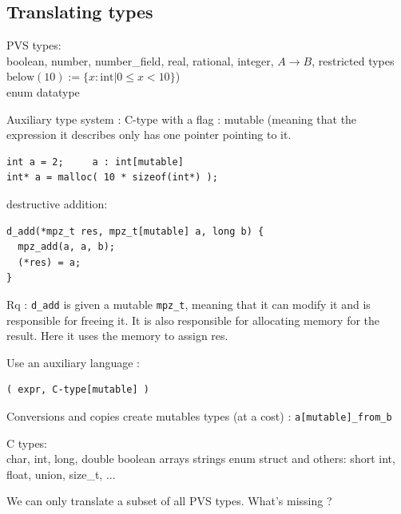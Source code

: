 \documentclass[12pt,a4paper,titlepage]{article}
\newcommand{\codeline}[1]{\texttt{#1}}
\newcommand{\mpzt}{\texttt{mpz\_t}}
\begin{document}
\subsection{Translating types}
PVS types:\\
boolean, number, number\_field, real, 
rational, integer, $A \rightarrow B$, restricted types
$\text{below}(10) := \{ x:\text{int} | 0 \leq x < 10 \} $)  \\
enum
datatype



Auxiliary type system :
C-type with a flag : mutable (meaning that the expression it describes only has one pointer pointing to it.

\begin{lstlisting}
int a = 2;     a : int[mutable]
int* a = malloc( 10 * sizeof(int*) );  
\end{lstlisting}

destructive addition:

\begin{lstlisting}
d_add(*mpz_t res, mpz_t[mutable] a, long b) {
  mpz_add(a, a, b);
  (*res) = a;
}
\end{lstlisting}

Rq : \codeline{d\_add} is given a mutable \mpzt, meaning that it can modify it and is responsible for freeing it.
It is also responsible for allocating memory for the result.
Here it uses the memory to assign res.



Use an auxiliary language :

\begin{lstlisting}
( expr, C-type[mutable] )
\end{lstlisting}

Conversions and copies create mutables types (at a cost) :
\codeline{a[mutable]\_from\_b}









C types:\\
[unsigned] char, int, long, double
boolean
arrays
strings
enum
struct
and others: short int, float, union, size\_t, ...










We can only translate a subset of all PVS types.
What's missing ?
\end{document}
